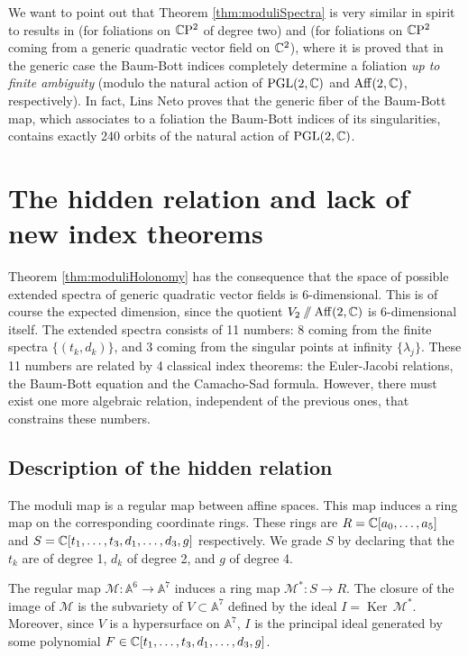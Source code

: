\documentclass[phd,tocprelim]{cornell}
\begin{document}
We want to point out that Theorem \ref{thm:moduliSpectra} is very similar in spirit to results in \cite{LinsNeto2012} (for foliations on $\mathbb{C}\mathrm{P}^2$ of degree two) and \cite{IlyashenkoMoldavskis2011} (for foliations on $\mathbb{C}\mathrm{P}^2$ coming from a generic quadratic vector field on $\mathbb{C}^2$), where it is proved that in the generic case the Baum-Bott indices completely determine a foliation \textit{up to finite ambiguity} (modulo the natural action of $\operatorname{PGL}({2},{\mathbb{C}})$ and $\operatorname{Aff}({2},{\mathbb{C}})$, respectively). In fact, Lins Neto proves that the generic fiber of the Baum-Bott map, which associates to a foliation the Baum-Bott indices of its singularities, contains exactly 240 orbits of the natural action of $\operatorname{PGL}({2},{\mathbb{C}})$.



\section{The hidden relation and lack of new index theorems}

Theorem \ref{thm:moduliHolonomy} has the consequence that the space of possible extended spectra of generic quadratic vector fields is 6-dimensional. This is of course the expected dimension, since the quotient $V_2\sslash\operatorname{Aff}({2},{\mathbb{C}})$ is 6-dimensional itself. The extended spectra consists of 11 numbers: 8 coming from the finite spectra $\{(t_k,d_k)\}$, and 3 coming from the singular points at infinity $\{\lambda_j\}$. These 11 numbers are related by 4 classical index theorems: the Euler-Jacobi relations, the Baum-Bott equation and the Camacho-Sad formula. However, there must exist one more algebraic relation, independent of the previous ones, that constrains these numbers.


\subsection{Description of the hidden relation}

The moduli map is a regular map between affine spaces. This map induces a ring map on the corresponding coordinate rings. These rings are $R=\mathbb{C}[a_0,\ldots,a_5]$ and $S=\mathbb{C}[t_1,\ldots,t_3,d_1,\ldots,d_3,g]$ respectively. We grade $S$ by declaring that the $t_k$ are of degree 1, $d_k$ of degree 2, and $g$ of degree 4. 

\begin{remark}
 The regular map $\mathcal{M}\colon\mathbb{A}^6\to\mathbb{A}^7$ induces a ring map $\mathcal{M}^*\colon S\to R$. The closure of the image of $\mathcal{M}$ is the subvariety of $V\subset\mathbb{A}^7$ defined by the ideal $I=\operatorname{Ker}\,\mathcal{M}^*$. Moreover, since $V$ is a hypersurface on $\mathbb{A}^7$, $I$ is the principal ideal generated by some polynomial $F\in \mathbb{C}[t_1,\ldots,t_3,d_1,\ldots,d_3,g]$.
\end{remark}
\end{document}

